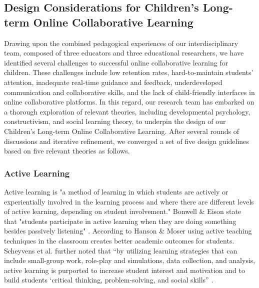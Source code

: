 \subsection{Design Considerations for Children's Long-term Online Collaborative Learning}
Drawing upon the combined pedagogical experiences of our interdisciplinary team, composed of three educators and three educational researchers, we have identified several challenges to successful online collaborative learning for children. These challenges include low retention rates, hard-to-maintain students' attention, inadequate real-time guidance and feedback, underdeveloped communication and collaborative skills, and the lack of child-friendly interfaces in online collaborative platforms. In this regard, our research team has embarked on a thorough exploration of relevant theories, including developmental psychology, constructivism, and social learning theory, to underpin the design of our Children's Long-term Online Collaborative Learning. After several rounds of discussions and iterative refinement, we converged a set of five design guidelines based on five relevant theories as follows. 

\subsubsection{Active Learning}
Active learning is "a method of learning in which students are actively or experientially involved in the learning process and where there are different levels of active learning, depending on student involvement." Bonwell \& Eison state that "students participate in active learning when they are doing something besides passively listening" \citep{bonwellactive}. According to Hanson \& Moser using active teaching techniques in the classroom creates better academic outcomes for students\cite{hanson2003reflections}. Scheyvens et al. further noted that “by utilizing learning strategies that can include small-group work, role-play and simulations, data collection, and analysis, active learning is purported to increase student interest and motivation and to build students ‘critical thinking, problem-solving, and social skills” \citep{scheyvens2008experimenting}.

